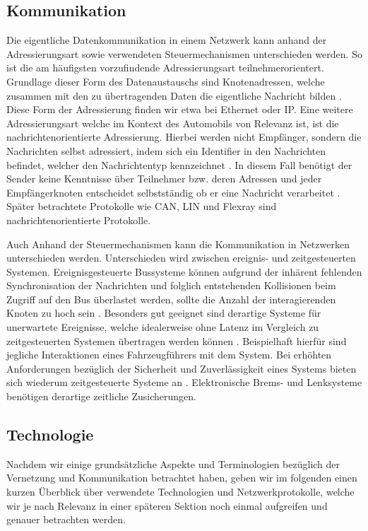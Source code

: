     \subsection{Kommunikation}
    Die eigentliche Datenkommunikation in einem Netzwerk kann anhand der Adressierungsart sowie verwendeten Steuermechanismen unterschieden werden. So ist
    die am häufigsten vorzufindende Adressierungsart teilnehmerorientert. Grundlage dieser Form des Datenaustauschs sind Knotenadressen, welche zusammen mit den
    zu übertragenden Daten die eigentliche Nachricht bilden \cite{reif2011bosch}. Diese Form der Adressierung finden wir etwa bei Ethernet oder IP. Eine weitere Adressierungsart 
    welche im Kontext des Automobils von Relevanz ist, ist die nachrichtenorientierte Adressierung. Hierbei werden nicht Empfänger, sondern die Nachrichten selbst
    adressiert, indem sich ein Identifier in den Nachrichten befindet, welcher den Nachrichtentyp kennzeichnet \cite{reif2011bosch}. In diesem Fall benötigt der Sender keine 
    Kenntnisse über Teilnehmer bzw. deren Adressen und jeder Empfängerknoten entscheidet selbstständig ob er eine Nachricht verarbeitet \cite{reif2011bosch}. Später betrachtete
    Protokolle wie CAN, LIN und Flexray sind nachrichtenorientierte Protokolle.

    Auch Anhand der Steuermechanismen kann die Kommunikation in Netzwerken unterschieden werden. Unterschieden wird zwischen ereignis- und zeitgesteuerten Systemen.
    Ereignisgesteuerte Bussysteme können aufgrund der inhärent fehlenden Synchronisation der Nachrichten und folglich entstehenden Kollisionen beim Zugriff auf den Bus
    überlastet werden, sollte die Anzahl der interagierenden Knoten zu hoch sein \cite{reif2011bosch}. Besonders gut geeignet sind derartige Systeme für unerwartete Ereignisse,
    welche idealerweise ohne Latenz im Vergleich zu zeitgesteuerten Systemen übertragen werden können \cite{reif2011bosch}. Beispielhaft hierfür sind jegliche Interaktionen eines 
    Fahrzeugführers mit dem System. Bei erhöhten Anforderungen bezüglich der Sicherheit und Zuverlässigkeit eines Systems bieten sich wiederum zeitgesteuerte Systeme an \cite{reif2011bosch}.
    Elektronische Brems- und Lenksysteme benötigen derartige zeitliche Zusicherungen.
    \subsection{Technologie}
    Nachdem wir einige grundsätzliche Aspekte und Terminologien bezüglich der Vernetzung und Kommunikation betrachtet haben, geben wir im folgenden einen kurzen Überblick
    über verwendete Technologien und Netzwerkprotokolle, welche wir je nach Relevanz in einer späteren Sektion noch einmal aufgreifen und genauer betrachten werden.
